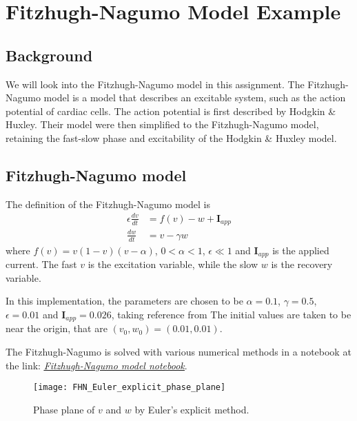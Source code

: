 \chapter{Fitzhugh-Nagumo Model Example}
\label{chap:fitzhugh-nagumo}
\section{Background}
\label{sec:background}
We will look into the Fitzhugh-Nagumo model in this assignment. The Fitzhugh-Nagumo model is a model that describes an excitable system, such as the action potential of cardiac cells. The action potential is first described by Hodgkin \& Huxley. Their model were then simplified to the Fitzhugh-Nagumo model, retaining the fast-slow phase and excitability of the Hodgkin \& Huxley model. %

\section{Fitzhugh-Nagumo model}
\label{sec:FHN}
The definition of the Fitzhugh-Nagumo model is
\begin{align}
    \epsilon \frac{dv}{dt} &= f(v) - w + \mathbf{I}_{app} \\
    \frac{dw}{dt} &= v - \gamma w
\end{align}
where $f(v) = v(1-v)(v-\alpha)$, $0 < \alpha < 1$, $\epsilon \ll 1$ and $\mathbf{I}_{app}$ is the applied current. The fast $v$ is the excitation variable, while the slow $w$ is the recovery variable.

In this implementation, the parameters are chosen to be $\alpha = 0.1$, $\gamma = 0.5$, $\epsilon = 0.01$ and $\mathbf{I}_{app} = 0.026$, taking reference from %
The initial values are taken to be near the origin, that are $(v_0, w_0) = (0.01, 0.01)$. 

The Fitzhugh-Nagumo is solved with various numerical methods in a notebook at the link:  \href{https://nbviewer.jupyter.org/github/FarmHJ/numerical-solver/blob/main/examples/fitzhugh_nagumo.ipynb}{\underline{\emph{Fitzhugh-Nagumo model notebook}}}. 

\begin{figure}
    \texttt{[image: FHN\_Euler\_explicit\_phase\_plane]}
    \caption{Phase plane of $v$ and $w$ by Euler's explicit method.}
    \label{fig:Euler_explicit_phase_plane}
\end{figure}

